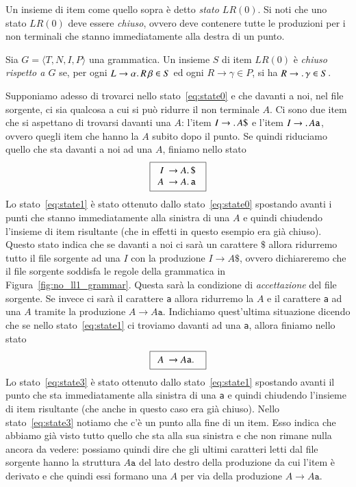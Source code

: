 Un insieme di item come quello sopra \`e detto \emph{stato $\mathit{LR}(0)$}.
Si noti che uno stato $\mathit{LR}(0)$ deve essere \emph{chiuso}, ovvero deve
contenere tutte le produzioni
per i non terminali che stanno immediatamente alla destra di un punto.
%
\begin{definition}\label{def:lr_state}
Sia $G=\langle T,N,I,P\rangle$ una grammatica.
Un insieme $S$ di item $\mathit{LR}(0)$
\`e \emph{chiuso rispetto a $G$} se, per ogni
$L\to\alpha.\, R\,\beta\in S$ ed ogni $R\to\gamma\in P$, si ha
$R\to.\,\gamma\in S$.
\end{definition}
%
Supponiamo adesso di trovarci nello stato~\eqref{eq:state0} e che davanti a
noi, nel file sorgente, ci sia qualcosa a cui si pu\`o ridurre il non
terminale $A$. Ci sono due item che si aspettano di trovarsi davanti una $A$:
l'item $I\to.\, A\mathtt{\$}$ e l'item $I\to.\, A\mathtt{a}$, ovvero
quegli item che hanno la $A$ subito dopo il punto. Se quindi riduciamo
quello che sta davanti a noi ad una $A$, finiamo nello stato
\begin{equation}\label{eq:state1}
  \fbox{$
  \begin{array}{rl}
     I \!\!\!& \to A.\,\mathtt{\$}\\
     A \!\!\!& \to A.\,\mathtt{a}
  \end{array}$
  }
\end{equation}
Lo stato~\eqref{eq:state1} \`e stato ottenuto dallo stato~\eqref{eq:state0}
spostando avanti i punti che stanno immediatamente alla sinistra di una $A$
e quindi chiudendo l'insieme di item
risultante (che in effetti in questo esempio era gi\`a chiuso).
Questo stato indica che se davanti a noi ci sar\`a un carattere $\mathtt{\$}$
allora ridurremo tutto il file sorgente ad una $I$ con la produzione
$I\to A\mathtt{\$}$, ovvero dichiareremo che il file sorgente soddisfa
le regole della grammatica in Figura~\ref{fig:no_ll1_grammar}.
Questa sar\`a la condizione di \emph{accettazione} del file sorgente.
Se invece ci sar\`a il carattere \texttt{a} allora
ridurremo la $A$ e il carattere \texttt{a} ad una $A$ tramite la
produzione $A\to A\mathtt{a}$. Indichiamo quest'ultima situazione dicendo
che se nello stato~\eqref{eq:state1} ci troviamo davanti ad una \texttt{a},
allora finiamo nello stato
\begin{equation}\label{eq:state3}
  \fbox{$
  \begin{array}{rl}
     A \!\!\!& \to A\mathtt{a}.\,
  \end{array}$
  }
\end{equation}
Lo stato~\eqref{eq:state3} \`e stato ottenuto dallo stato~\eqref{eq:state1}
spostando avanti il punto che sta immediatamente alla sinistra di una
\texttt{a} e quindi chiudendo l'insieme di item risultante
(che anche in questo caso era gi\`a chiuso).
Nello stato~\eqref{eq:state3} notiamo che c'\`e un punto alla fine di un item.
Esso indica che abbiamo gi\`a
visto tutto quello che sta alla sua sinistra e che non rimane nulla
ancora da vedere: possiamo quindi dire che gli ultimi caratteri letti
dal file sorgente hanno la struttura $A\mathtt{a}$ del lato destro della
produzione da cui l'item \`e derivato e che quindi essi formano una $A$ per
via della produzione $A\to A\mathtt{a}$.

